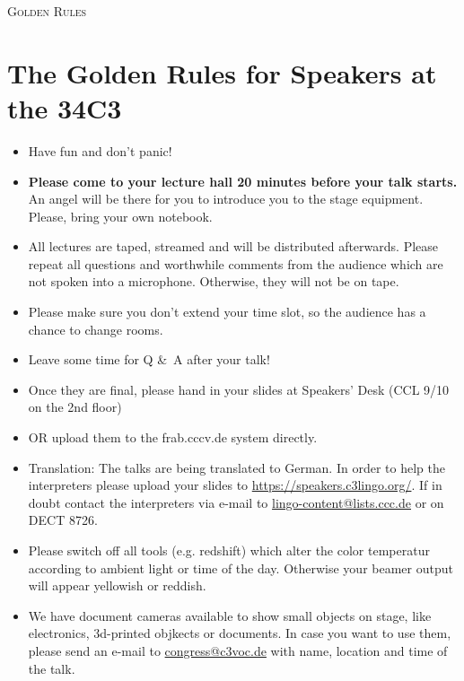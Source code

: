 \documentclass[paper=a4]{scrartcl}
\begin{document}
	\begin{center} \textsc{\Huge Golden Rules}\end{center}
	\hfill
	\section*{The Golden Rules for Speakers at the 34C3}
	\begin{itemize}
		\item Have fun and don't panic!
		\item \textbf{Please come to your lecture hall 20 minutes before your talk starts.} An
		angel will be there	for	you	to introduce you to	the stage equipment. Please, bring your own notebook.
		\item All lectures are taped, streamed and will be distributed afterwards. Please repeat all questions and worthwhile comments from the audience which are not spoken into a microphone. Otherwise, they will not be on tape.
		\item Please make sure you don't extend your time slot, so the audience has a chance to change rooms.
		\item Leave some time for Q \&\ A after your talk!
		\item Once they are final, please hand in your slides at Speakers' Desk (CCL 9/10 on the 2nd floor) 
		\item[] OR upload them to the frab.cccv.de system directly.
		\item Translation: The talks are being translated to German. In order to help the interpreters please upload your slides to \url{https://speakers.c3lingo.org/}. If in doubt contact the interpreters via e-mail  to \url{lingo-content@lists.ccc.de} or on DECT 8726.
		\item Please switch off all tools (e.g. redshift) which alter the color temperatur according to ambient light or time of the day. Otherwise your beamer output will appear yellowish or reddish.
		\item We have document cameras available to show small objects on stage, like electronics, 3d-printed objkects or documents. In case you want to use them, please send an e-mail to \url{congress@c3voc.de} with name, location and time of the talk.
	\end{itemize}
\end{document}
